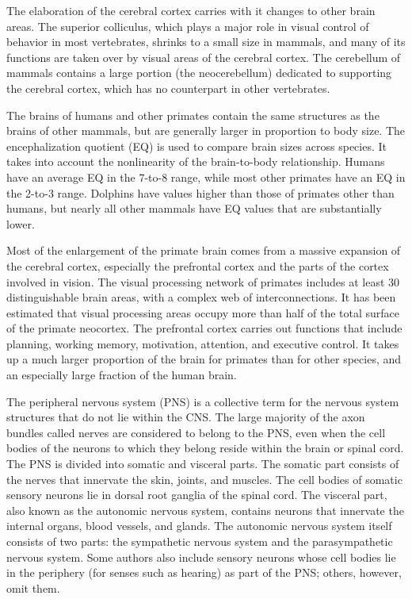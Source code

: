 The elaboration of the cerebral cortex carries with it changes to other brain areas. The superior colliculus, which plays a major role in visual control of behavior in most vertebrates, shrinks to a small size in mammals, and many of its functions are taken over by visual areas of the cerebral cortex. The cerebellum of mammals contains a large portion (the neocerebellum) dedicated to supporting the cerebral cortex, which has no counterpart in other vertebrates.

The brains of humans and other primates contain the same structures as the brains of other mammals, but are generally larger in proportion to body size. The encephalization quotient (EQ) is used to compare brain sizes across species. It takes into account the nonlinearity of the brain-to-body relationship. Humans have an average EQ in the 7-to-8 range, while most other primates have an EQ in the 2-to-3 range. Dolphins have values higher than those of primates other than humans, but nearly all other mammals have EQ values that are substantially lower.

Most of the enlargement of the primate brain comes from a massive expansion of the cerebral cortex, especially the prefrontal cortex and the parts of the cortex involved in vision. The visual processing network of primates includes at least 30 distinguishable brain areas, with a complex web of interconnections. It has been estimated that visual processing areas occupy more than half of the total surface of the primate neocortex. The prefrontal cortex carries out functions that include planning, working memory, motivation, attention, and executive control. It takes up a much larger proportion of the brain for primates than for other species, and an especially large fraction of the human brain.

The peripheral nervous system (PNS) is a collective term for the nervous system structures that do not lie within the CNS. The large majority of the axon bundles called nerves are considered to belong to the PNS, even when the cell bodies of the neurons to which they belong reside within the brain or spinal cord. The PNS is divided into somatic and visceral parts. The somatic part consists of the nerves that innervate the skin, joints, and muscles. The cell bodies of somatic sensory neurons lie in dorsal root ganglia of the spinal cord. The visceral part, also known as the autonomic nervous system, contains neurons that innervate the internal organs, blood vessels, and glands. The autonomic nervous system itself consists of two parts: the sympathetic nervous system and the parasympathetic nervous system. Some authors also include sensory neurons whose cell bodies lie in the periphery (for senses such as hearing) as part of the PNS; others, however, omit them.

